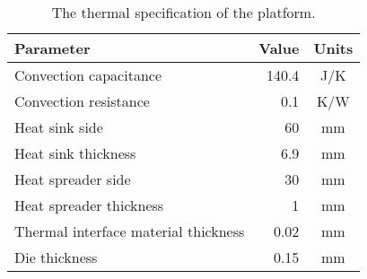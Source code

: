 \begin{table}[t]
  \centering
  \caption{The thermal specification of the platform.}
  \begin{tabular}{lrc}
    \toprule
    Parameter & Value & Units \\
    \midrule
    Convection capacitance                &  140.4 & J/K \\
    Convection resistance                 &    0.1 & K/W \\
    Heat sink side                        &     60 & mm \\
    Heat sink thickness                   &    6.9 & mm \\
    Heat spreader side                    &     30 & mm \\
    Heat spreader thickness               &      1 & mm \\
    Thermal interface material thickness  &   0.02 & mm \\
    Die thickness                         &   0.15 & mm \\
    \bottomrule
  \end{tabular}
  \vspace{-1.0em}
\end{table}
